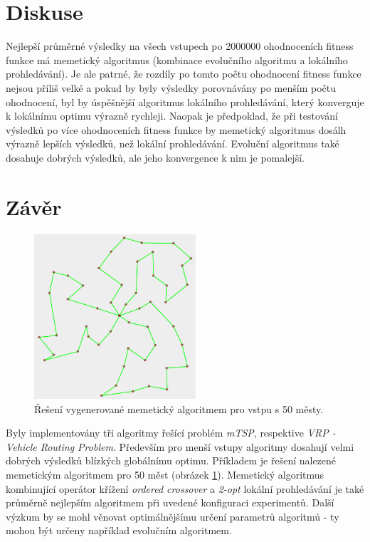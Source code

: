 \documentclass[journal]{IEEEtrancz}
\begin{document}
\section{Diskuse}
Nejlepší průměrné výsledky na všech vstupech po 2000000 ohodnoceních fitness funkce má memetický algoritmus (kombinace evolučního algoritmu a lokálního prohledávání). 
Je ale patrné, že rozdíly po tomto počtu ohodnocení fitness funkce nejsou příliš velké a pokud by byly výsledky porovnávány po menším počtu ohodnocení, byl by úspěšnější 
algoritmus lokálního prohledávání, který konverguje k lokálnímu optimu výrazně rychleji. Naopak je předpoklad, že při testování výsledků po více ohodnoceních fitness funkce
by memetický algoritmus dosálh výrazně lepších výsledků, než lokální prohledávání. Evoluční algoritmus také dosahuje dobrých výsledků, ale jeho konvergence k nim je pomalejší.

\section{Závěr}

\begin{figure}[ht]
  \centering
    \includegraphics[width=6cm]{50_meme}
      \caption{Řešení vygenerované memetický algoritmem pro vstpu s 50 městy.}
    \label{fig:res}
\end{figure}

Byly implementovány tři algoritmy řešící problém \textit{mTSP}, respektive \textit{VRP - Vehicle Routing Problem}. Především pro menší vstupy algoritmy dosahují velmi dobrých výsledků
blízkých globálnímu optimu. Příkladem je řešení nalezené memetickým algoritmem pro 50 měst (obrázek \ref{fig:res}). Memetický algoritmus kombinující operátor křížení \textit{ordered crossover} a \textit{2-opt} lokální prohledávání je také průměrně nejlepším algoritmem při uvedené konfiguraci experimentů.
Další výzkum by se mohl věnovat optimálnějšímu určení parametrů algoritmů - ty mohou být určeny například evolučním algoritmem.
\end{document}
